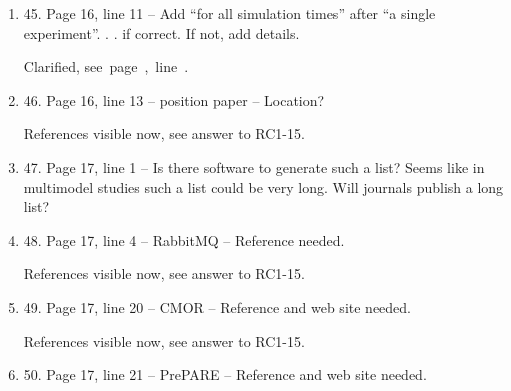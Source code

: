 \documentclass[gmd,manuscript]{copernicus}
\newcommand{\plref}[1]{\mbox{see page \pageref{p-#1}, line
    \lineref{l-#1}.}}
\newenvironment{answer}{\color{blue}}{}
\begin{document}
\begin{enumerate}[label=RC1-\arabic*,leftmargin=*]
  \begin{answer}
    Added above, \plref{RC1-37}
  \end{answer}
\item 45. Page 16, line 11 -- Add “for all simulation times” after “a
  single experiment”. . . if correct. If not, add details.

  \begin{answer}
    Clarified, \plref{RC1-45}
  \end{answer}
\item 46. Page 16, line 13 -- position paper -- Location?

  \begin{answer}
    References visible now, see answer to RC1-15.
  \end{answer}
\item 47. Page 17, line 1 -- Is there software to generate such a list?
  Seems like in multimodel studies such a list could be very long.
  Will journals publish a long list?
\item 48. Page 17, line 4 -- RabbitMQ -- Reference needed.

  \begin{answer}
    References visible now, see answer to RC1-15.
  \end{answer}
\item 49. Page 17, line 20 -- CMOR -- Reference and web site needed.

  \begin{answer}
    References visible now, see answer to RC1-15.
  \end{answer}
\item 50. Page 17, line 21 -- PrePARE -- Reference and web site needed.


\end{enumerate}
\end{document}
